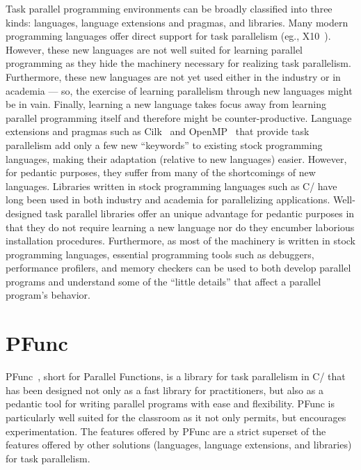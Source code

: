 \documentclass[9pt,twocolumn,letter]{article}
\begin{document}
Task parallel programming environments can be broadly classified into three
kinds: languages, language extensions and pragmas, and libraries.
Many modern programming languages offer direct support for task parallelism
(eg., X10~\cite{Charles:2005p1232}).
%
However, these new languages are not well suited for learning parallel
programming as they hide the machinery necessary for realizing task
parallelism.
%
Furthermore, these new languages are not yet used either in the industry or in
academia --- so, the exercise of learning parallelism through new languages 
might be in vain.
%
Finally, learning a new language takes focus away from learning parallel
programming itself and therefore might be counter-productive.
Language extensions and pragmas such as Cilk~\cite{FrigoLeRa98} and
OpenMP~\cite{kn:omp_30} that provide task parallelism add only a few new
``keywords'' to existing stock programming languages, making their adaptation
(relative to new languages) easier.
%
However, for pedantic purposes, they suffer from many of the shortcomings of
new languages.
Libraries written in stock programming languages such as C/\Cpp{} have long 
been used in both industry and academia for parallelizing applications.
%
Well-designed task parallel libraries offer an unique advantage for pedantic
purposes in that they do not require learning a new language nor do they
encumber laborious installation procedures.
%
Furthermore, as most of the machinery is written in stock programming
languages, essential programming tools such as debuggers, performance
profilers, and memory checkers can be used to both develop parallel programs
and understand some of the ``little details'' that affect a parallel program's
behavior.

%
%
%
\section{PFunc}
\label{sec:pfunc}
PFunc~\cite{kambadur09:pfunc}, short for Parallel Functions, is a library for
task parallelism in C/\Cpp{} that has been designed not only as a fast library
for practitioners, but also as a pedantic tool for writing parallel programs
with ease and flexibility.
%
PFunc is particularly well suited for the classroom as it not only permits, but
encourages experimentation.
%
The features offered by PFunc are a strict superset of the features offered by
other solutions (languages, language extensions, and libraries) for task
parallelism.
\end{document}
